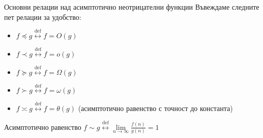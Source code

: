 \begin{boxnotation}{Основни релации над асимптотично неотрицателни функции}{}
	Въвеждаме следните пет релации за удобство:
	\begin{itemize}
		\item $f\preccurlyeq g\overset{\text{def}}\leftrightarrow f=O(g)$
		\item $f\prec g\overset{\text{def}}\leftrightarrow f=o(g)$
		\item $f\succcurlyeq g\overset{\text{def}}\leftrightarrow f=\Omega(g)$
		\item $f\succ g\overset{\text{def}}\leftrightarrow f=\omega(g)$
		\item $f\asymp g\overset{\text{def}}\leftrightarrow f=\theta(g)$ (асимптотично равенство с точност до константа)
	\end{itemize}
\end{boxnotation}

\begin{boxnotation}{Асимптотично равенство}{}
	$f\sim g\overset{\text{def}}\leftrightarrow\lim\limits_{n\to\infty}\frac{f(n)}{g(n)}=1$
\end{boxnotation}

